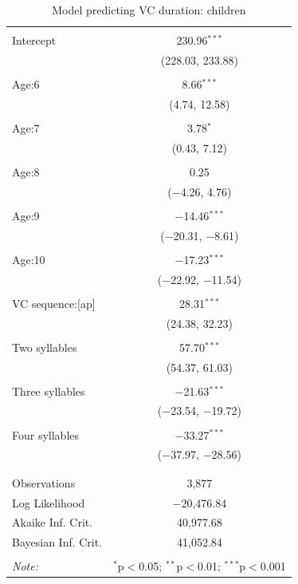 \documentclass[
]{article}
\begin{document}
\begin{table}[!htbp] \centering 
  \caption{Model predicting VC duration: children} 
  \label{} 
\begin{tabular}{@{\extracolsep{5pt}}lc} 
\\[-1.8ex]\hline 
\hline \\[-1.8ex] 
 Intercept & 230.96$^{***}$ \\ 
  & (228.03, 233.88) \\ 
  & \\ 
 Age:6 & 8.66$^{***}$ \\ 
  & (4.74, 12.58) \\ 
  & \\ 
 Age:7 & 3.78$^{*}$ \\ 
  & (0.43, 7.12) \\ 
  & \\ 
 Age:8 & 0.25 \\ 
  & ($-$4.26, 4.76) \\ 
  & \\ 
 Age:9 & $-$14.46$^{***}$ \\ 
  & ($-$20.31, $-$8.61) \\ 
  & \\ 
 Age:10 & $-$17.23$^{***}$ \\ 
  & ($-$22.92, $-$11.54) \\ 
  & \\ 
 VC sequence:[ap] & 28.31$^{***}$ \\ 
  & (24.38, 32.23) \\ 
  & \\ 
 Two syllables & 57.70$^{***}$ \\ 
  & (54.37, 61.03) \\ 
  & \\ 
 Three syllables & $-$21.63$^{***}$ \\ 
  & ($-$23.54, $-$19.72) \\ 
  & \\ 
 Four syllables & $-$33.27$^{***}$ \\ 
  & ($-$37.97, $-$28.56) \\ 
  & \\ 
\hline \\[-1.8ex] 
Observations & 3,877 \\ 
Log Likelihood & $-$20,476.84 \\ 
Akaike Inf. Crit. & 40,977.68 \\ 
Bayesian Inf. Crit. & 41,052.84 \\ 
\hline 
\hline \\[-1.8ex] 
\textit{Note:}  & \multicolumn{1}{r}{$^{*}$p$<$0.05; $^{**}$p$<$0.01; $^{***}$p$<$0.001} \\ 
\end{tabular} 
\end{table}
\end{document}
